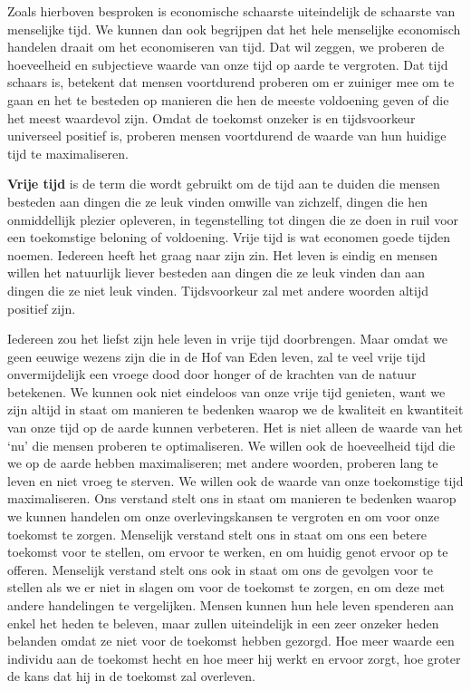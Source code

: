 \documentclass[
  a5paper,
  smalldemyvopaper,11pt,twoside,onecolumn,openright,extrafontsizes,
hidelinks]{memoir}
\begin{document}
Zoals hierboven besproken is economische schaarste uiteindelijk de
schaarste van menselijke tijd. We kunnen dan ook begrijpen dat het hele
menselijke economisch handelen draait om het economiseren van tijd. Dat
wil zeggen, we proberen de hoeveelheid en subjectieve waarde van onze
tijd op aarde te vergroten. Dat tijd schaars is, betekent dat mensen
voortdurend proberen om er zuiniger mee om te gaan en het te besteden op
manieren die hen de meeste voldoening geven of die het meest waardevol
zijn. Omdat de toekomst onzeker is en tijdsvoorkeur universeel positief
is, proberen mensen voortdurend de waarde van hun huidige tijd te
maximaliseren.

\textbf{Vrije tijd} is de term die wordt gebruikt om de tijd aan te
duiden die mensen besteden aan dingen die ze leuk vinden omwille van
zichzelf, dingen die hen onmiddellijk plezier opleveren, in
tegenstelling tot dingen die ze doen in ruil voor een toekomstige
beloning of voldoening. Vrije tijd is wat economen goede tijden noemen.
Iedereen heeft het graag naar zijn zin. Het leven is eindig en mensen
willen het natuurlijk liever besteden aan dingen die ze leuk vinden dan
aan dingen die ze niet leuk vinden. Tijdsvoorkeur zal met andere woorden
altijd positief zijn.

Iedereen zou het liefst zijn hele leven in vrije tijd doorbrengen. Maar
omdat we geen eeuwige wezens zijn die in de Hof van Eden leven, zal te
veel vrije tijd onvermijdelijk een vroege dood door honger of de
krachten van de natuur betekenen. We kunnen ook niet eindeloos van onze
vrije tijd genieten, want we zijn altijd in staat om manieren te
bedenken waarop we de kwaliteit en kwantiteit van onze tijd op de aarde
kunnen verbeteren. Het is niet alleen de waarde van het `nu' die mensen
proberen te optimaliseren. We willen ook de hoeveelheid tijd die we op
de aarde hebben maximaliseren; met andere woorden, proberen lang te
leven en niet vroeg te sterven. We willen ook de waarde van onze
toekomstige tijd maximaliseren. Ons verstand stelt ons in staat om
manieren te bedenken waarop we kunnen handelen om onze overlevingskansen
te vergroten en om voor onze toekomst te zorgen. Menselijk verstand
stelt ons in staat om ons een betere toekomst voor te stellen, om ervoor
te werken, en om huidig genot ervoor op te offeren. Menselijk verstand
stelt ons ook in staat om ons de gevolgen voor te stellen als we er niet
in slagen om voor de toekomst te zorgen, en om deze met andere
handelingen te vergelijken. Mensen kunnen hun hele leven spenderen aan
enkel het heden te beleven, maar zullen uiteindelijk in een zeer onzeker
heden belanden omdat ze niet voor de toekomst hebben gezorgd. Hoe meer
waarde een individu aan de toekomst hecht en hoe meer hij werkt en
ervoor zorgt, hoe groter de kans dat hij in de toekomst zal overleven.
\end{document}
